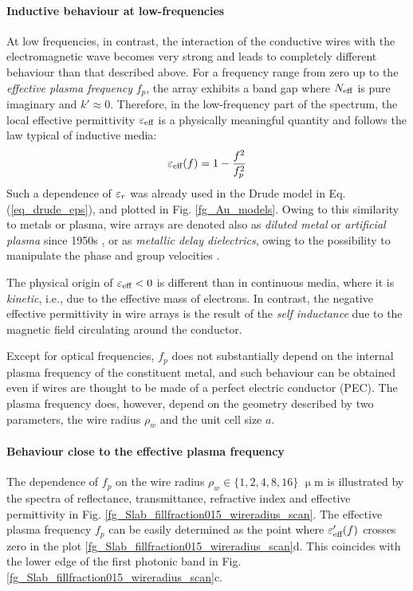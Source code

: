 \paragraph{Inductive behaviour at low-frequencies}%
At low frequencies, in contrast, the interaction of the conductive wires with the electromagnetic wave becomes very strong and leads to completely different behaviour than that described above. For a frequency range from zero up to the \textit{effective plasma frequency} $f_p$, the array exhibits a band gap where $N_{\text{eff} }$ is pure imaginary and $k'\approx 0$. Therefore, in the low-frequency part of the spectrum, the local effective permittivity $\varepsilon_{\text{eff} }$ is a physically meaningful quantity and follows the law typical of inductive media:
\begin{equation} \varepsilon_{\text{eff} }(f) = 1 - \frac{f^{2}}{f_p^{2}}\label{eq_eeff_plasma}\end{equation}
Such a dependence of $\varepsilon_r$ was already used in the Drude model in Eq. (\ref{eq_drude_eps}), and plotted in Fig. \ref{fg_Au_models}. Owing to this similarity to metals or plasma, wire arrays are denoted also as \textit{diluted metal} or \textit{artificial plasma} since 1950s \cite{merkel1973simulation, rotman1962plasma}, or as \textit{metallic delay dielectrics}, owing to the possibility to manipulate the phase and group velocities  \cite[p. 54]{brown1953artificial}.

The physical origin of $\varepsilon_{\text{eff} }<0$ is different than in continuous media, where it is \textit{kinetic}, i.e., due to the effective mass of electrons. In contrast, the negative effective permittivity in wire arrays is the result of the \textit{self inductance} due to the magnetic field circulating around the conductor. 

Except for optical frequencies, $f_p$ does not substantially depend on the internal plasma frequency of the constituent metal, and such behaviour can be obtained even if wires are thought to be made of a perfect electric conductor (PEC).
The plasma frequency does, however, depend on the geometry described by two parameters, the wire radius $\rho_w$ and the unit cell size $a$. 

\paragraph{Behaviour close to the effective plasma frequency}%
The dependence of $f_p$ on the wire radius $\rho_w \in \{1, 2, 4, 8, 16\}$ $\upmu$m is illustrated by the spectra of reflectance, transmittance, refractive index and effective permittivity in Fig. \ref{fg_Slab_fillfraction015_wireradius_scan}. The effective plasma frequency $f_p$ can be easily determined as the point where $\varepsilon_{\text{eff} }'(f)$ crosses zero  in the plot \ref{fg_Slab_fillfraction015_wireradius_scan}d. This coincides with the lower edge of the first photonic band in Fig. \ref{fg_Slab_fillfraction015_wireradius_scan}c. 

